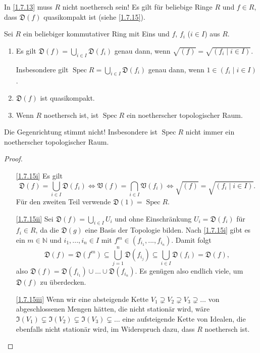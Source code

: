 \documentclass[a4paper,12pt,index=toc]{scrbook}
\theoremstyle{keinenummern} %
\def\V{\mathfrak{V}}
\def\I{\mathfrak{I}}
\newcommand{\D}{\mathfrak{D}}
\newcommand{\Spec}{\operatorname{Spec}}
\renewcommand{\dotsc}{\ensuremath{\!...}}
\newcommand{\set}[1]{\ensuremath{\mathbb{#1}}}
\newcommand{\N}{\set{N}}
\begin{document}
\begin{bem*}
  In \cref{1.7.13} muss $R$ nicht noethersch sein! Es gilt für beliebige Ringe $R$ und $f\in R$, dass $\D(f)$ quasikompakt ist
  (siehe \cref{1.7.15}).
\end{bem*}

\begin{bem}\label{1.7.15}
  Sei $R$ ein beliebiger kommutativer Ring mit Eins und $f$, $f_i$ ($i\in I$) aus $R$.
  \begin{enumerate}
  \item{} Es gilt $\displaystyle \D(f)=\bigcup_{i\in I}\D(f_i)$ genau dann, wenn $\sqrt{(f)}=\sqrt{(f_i\mid i\in
      I)}$. 
      
      Insbesondere gilt $\displaystyle\Spec R=\bigcup_{i\in I}\D(f_i)$ genau dann, wenn $1\in(f_i\mid i\in I)$.
  \item{} $\D(f)$ ist quasikompakt.
  \item{} Wenn $R$ noethersch ist, ist $\Spec R$ ein noetherscher topologischer Raum.
  \end{enumerate}
\end{bem}

    \begin{w}
      Die Gegenrichtung stimmt nicht! Insbesondere ist $\Spec R$ nicht immer ein noetherscher topologischer Raum.
    \end{w}

\begin{proof}
  \begin{enumerate}
  \item[\ref{1.7.15i}] Es gilt 
  \[\displaystyle \D(f)=\bigcup_{i\in I}\D(f_i) \iff \V(f)=\bigcap_{i\in I}\V(f_i) \iff
    \sqrt{(f)}=\sqrt{(f_i\mid i\in I)}.\]
%
     Für den zweiten Teil verwende $\D(1)=\Spec R$.
  \item[\ref{1.7.15ii}] Sei $\D(f)=\bigcup_{i\in I} U_i$ und ohne Einschränkung $U_i=\D(f_i)$ für $f_i\in R$, da die $\D(g)$ eine
    Basis der Topologie bilden. Nach \ref{1.7.15i} gibt es ein $m\in\N$ und $i_1,\dotsc,i_n\in I$ mit
    $f^m\in(f_{i_1},\dotsc,f_{i_n})$. Damit folgt \[ \D(f)=\D(f^m)\subseteq\bigcup_{j=1}^n \D(f_{i_j}) \subseteq\bigcup_{i\in I}
    \D(f_i) = \D(f), \] also $\D(f)=\D(f_{i_1})\cup\dotso\cup \D(f_{i_n})$. Es genügen also endlich viele, um $\D(f)$ zu überdecken.
  \item[\ref{1.7.15iii}] Wenn wir eine absteigende Kette $V_1\supsetneq V_2\supsetneq V_3\supsetneq\dotso$ von abgeschlossenen
    Mengen hätten, die nicht stationär wird, wäre $\I(V_1)\subsetneq\I(V_2)\subsetneq\I(V_3)\subsetneq\dotso$ eine aufsteigende
    Kette von Idealen, die ebenfalls nicht stationär wird, im Widerspruch dazu, dass $R$ noethersch ist.
  \end{enumerate}
\end{proof}
\end{document}
